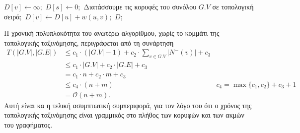\documentclass{article}
\makeatletter
\newenvironment{yellowalgo}{
    \begin{tcolorbox}[colback=myyellow, colframe=myyellow, boxrule=0.5pt]
    \begin{algorithmic}[1]
    \setcounter{ALG@line}{-1}
}{
    \end{algorithmic}
    \end{tcolorbox}
}
\makeatother
\begin{document}
\begin{yellowalgo}
            \State $D[v] \gets \infty;$
        \EndFor
        \State $D[s] \gets 0;$
        \State Διατάσσουμε τις κορυφές του συνόλου $G.V$ σε τοπολογική σειρά$;$ 
                    \State $D[v] \gets D[u] + w(u, v);$
                \EndIf
            \EndFor
        \EndFor
        \State \Return $D;$
    \EndFunction
\end{yellowalgo}
\noindent
Η χρονική πολυπλοκότητα του ανωτέρω αλγορίθμου, χωρίς το κομμάτι της τοπολογικής ταξινόμησης, περιγράφεται από τη συνάρτηση
\begin{align*}
    T\left(|G.V|, |G.E|\right) &\leq c_1 \cdot \left(|G.V| - 1 \right) + c_2 \cdot \sum_{v \in G.V} |N^-(v)| + c_3 \\
    &\leq c_1 \cdot |G.V| + c_2 \cdot |G.E| + c_3 \\
    &= c_1 \cdot n + c_2 \cdot m + c_3 \\
    &\leq c_4 \cdot (n + m)  & c_4  = \max\{c_1, c_2\} + c_3 + 1 \\
    &= \mathcal{O}(n + m).
\end{align*}
Αυτή είναι κα η τελική ασυμπτωτική συμπεριφορά, για τον λόγο του ότι ο χρόνος της τοπολογικής ταξινόμησης είναι γραμμικός στο πλήθος των κορυφών και των ακμών του γραφήματος.
\end{document}
